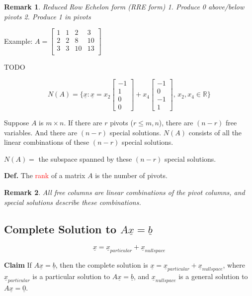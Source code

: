 \documentclass[12pt,a4paper]{article}
\newtheorem*{rem}{Remark}
\newcommand{\Remark}[1]{
  \begin{rem}
    \color{cyan}
    #1
  \end{rem}
}
\begin{document}
\Remark{Reduced Row Echelon form (RRE form) 1. Produce 0 above/below pivots 2. Produce 1 in pivots} 

Example:
$
A = 
\begin{bmatrix}
  1 & 1 & 2 & 3 \\
  2 & 2 & 8 & 10 \\
  3 & 3 & 10 & 13 \\
\end{bmatrix}
$

TODO

\[
  N(A) = \{ \underline{x}: \underline{x} = 
    x_2
    \begin{bmatrix}
      -1 \\
      1 \\
      0 \\
      0
    \end{bmatrix} + 
    x_4
    \begin{bmatrix}
      -1 \\
      0 \\
      -1 \\
      1
    \end{bmatrix},\, x_2, x_4 \in \mathbb{R}
  \} 
\]

Suppose $A$ is $m \times n$. If there are $r$ pivots ($r \leq m, n$),
there are $(n - r)$ free variables. And there are $(n - r)$ special solutions.
$N(A)$ consists of all the linear combinations of these $(n-r)$ special solutions.

\begin{center}
  $N(A) =$ the subspace spanned by these $(n-r)$ special solutions.
\end{center}

\textbf{Def.} The \textcolor{red}{rank} of a matrix $A$ is the number of pivots.

\Remark{All free columns are linear combinations of the pivot columns, and special solutions describe these combinations.}

\subsection*{Complete Solution to $A\underline{x} = \underline{b}$}

\[ \underline{x} = \underline{x}_{particular} + \underline{x}_{nullspace} \]

\textbf{Claim} If $A\underline{x}=\underline{b}$, 
then the complete solution is $\underline{x} = \underline{x}_{particular} + \underline{x}_{nullspace}$, 
where $\underline{x}_{particular}$ is a particular solution to $A\underline{x}=\underline{b}$, and $\underline{x}_{nullspace}$ is a general solution to $A\underline{x} = \underline{0}$.
\end{document}
